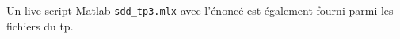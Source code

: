 \documentclass[11pt,twoside,a4paper]{article}
\begin{document}


\cleardoublepage
\tableofcontents
\newpage

Un live script Matlab \texttt{sdd\_tp3.mlx} avec l'énoncé est également fourni parmi les fichiers du tp.




\end{document}
